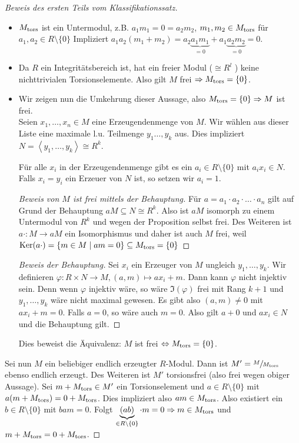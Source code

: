 \begin{proof}[Beweis des ersten Teils vom Klassifikationssatz] \leavevmode
	\begin{itemize}
		\item  $M_{\operatorname{tors}}$ ist ein Untermodul, z.B. $a_1 m_1  = 0 = a_2 m_2$, $m_1, m_2 \in M_{\operatorname{tors}}$ für $a_1,a_2 \in R \setminus \{0\} $ 
			Impliziert $a_1 a_2 (m_1 + m_2) = a_2 \underbrace{a_1 m_1}_{= 0} + a_1 \underbrace{a_2 m_2}_{= 0} = 0$.
		\item Da $R$ ein Integritätsbereich ist, hat ein freier Modul ($\cong R^{l}$ )  keine nichttrivialen Torsionselemente.
			Also gilt $M$ frei $\Rightarrow M_{\operatorname{tors}} = \{0\}$.
		\item Wir zeigen nun die Umkehrung dieser Aussage, also $M_{\operatorname{tors}} = \{0\} \Rightarrow M$ ist frei.\\
			Seien $x_1,\ldots,x_{n} \in M$ eine Erzeugendenmenge von $M$.
			Wir wählen aus dieser Liste eine maximale l.u. Teilmenge $y_1\ldots,y_{k}$ aus.
			Dies impliziert $N = \left< y_1,\ldots,y_{k} \right> \cong R^{k}$.
			\begin{claim}
				Für alle $x_{i}$ in der Erzeugendenmenge gibt es ein $a_{i} \in R \setminus \{0\} $ mit $a_{i} x_{i} \in N$.
				Falls $x_{i} = y_{i}$ ein Erzeuer von $N$ ist, so setzen wir $a_{i} = 1$. 
			\end{claim}
			\begin{proof}[Beweis von $M$ ist frei mittels der Behauptung]
				Für $a  = a_1 \cdot a_2 \cdot \ldots \cdot a_{n}$ gilt auf Grund der Behauptung $a M \subseteq N \cong R^{k}$.
				Also ist $a M$ isomorph zu einem Untermodul von $R^{k}$ und wegen der Proposition selbst frei.
				Des Weiteren ist $a \cdot : M \to aM$ ein Isomorphismus und daher ist auch $M$ frei,
				weil $\operatorname{Ker}(a\cdot ) = \{ m \in M \mid am = 0\} \subseteq M_{\operatorname{tors}} = \{0\} $
			\end{proof}

			\begin{proof}[Beweis der Behauptung]
				Sei $x_{i}$ ein Erzeuger von $M$ ungleich $y_1,\ldots,y_{k}$.
				Wir definieren $\varphi: R \times N \to M, (a,m) \mapsto a x_{i} + m$.
				Dann kann $\varphi$ nicht injektiv sein. Denn wenn $\varphi$ injektiv wäre, so wäre $\Im(\varphi)$ frei mit Rang $k+1$ 
				und $y_1,\ldots,y_{k}$ wäre nicht maximal gewesen. Es gibt also $(a,m) \neq 0$ mit $a x_{i} + m = 0$.
				Falls $a = 0$, so wäre auch $m = 0$.
				Also gilt $a+0$ und $a x_{i} \in N$ und die Behauptung gilt.
			\end{proof}
			Dies beweist die Äquivalenz: $M$ ist frei $\Leftrightarrow M_{\operatorname{tors}} = \{0\} $.
	\end{itemize}
	Sei nun $M$ ein beliebiger endlich erzeugter $R$-Modul. Dann ist  $M' = \sfrac{M}{M_{\operatorname{tors}}}$ ebenso endlich erzeugt.
	Des Weiteren ist $M'$ torsionsfrei (also frei wegen obiger Aussage).
	Sei $m + M_{\operatorname{tors}} \in M'$ ein Torsionselement und $a \in R \setminus \{0\} $ mit $a (m + M_{\operatorname{tors}}) = 0 + M_{\operatorname{tors}}$.
	Dies impliziert also $a m \in M_{\operatorname{tors}}$. Also existiert ein $b \in R \setminus \{0\} $ mit $b a m = 0$.
	Folgt $\underbrace{(ab)}_{\in R \setminus \{0\}} \cdot m = 0 \Rightarrow m \in M_{\operatorname{tors}}$ und $m + M_{\operatorname{tors}} = 0 + M_{\operatorname{tors}}$.


\end{proof}
